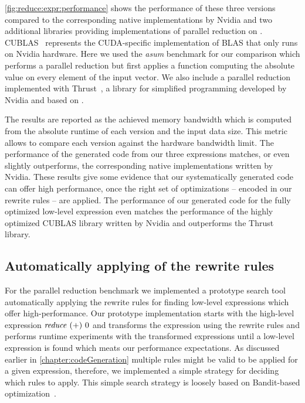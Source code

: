 \autoref{fig:reduce:expr:performance} shows the performance of these three versions compared to the corresponding native \OpenCL implementations by Nvidia and two additional libraries providing implementations of parallel reduction on \GPUs.
CUBLAS~\cite{cuBLAS} represents the CUDA-specific implementation of BLAS that only runs on Nvidia hardware.
Here we used the \emph{asum} benchmark for our comparison which performs a parallel reduction but first applies a function computing the absolute value on every element of the input vector.
We also include a parallel reduction implemented with Thrust~\cite{BellHo2011}, a library for simplified \GPU programming developed by Nvidia and based on \CUDA.

The results are reported as the achieved memory bandwidth which is computed from the absolute runtime of each version and the input data size.
This metric allows to compare each version against the hardware bandwidth limit.
The performance of the generated \OpenCL code from our three expressions matches, or even slightly outperforms, the corresponding native \OpenCL implementations written by Nvidia.
These results give some evidence that our systematically generated code can offer high performance, once the right set of optimizations -- encoded in our rewrite rules -- are applied.
The performance of our generated code for the fully optimized low-level expression even matches the performance of the highly optimized CUBLAS library written by Nvidia and outperforms the Thrust library.

\subsection{Automatically applying of the rewrite rules}

For the parallel reduction benchmark we implemented a prototype search tool automatically applying the rewrite rules for finding low-level expressions which offer high-performance.
Our prototype implementation starts with the high-level expression $\text{\textit{reduce}}\ (+)\ 0$ and transforms the expression using the rewrite rules and performs runtime experiments with the transformed expressions until a low-level \OpenCL expression is found which meats our performance expectations.
As discussed earlier in \autoref{chapter:codeGeneration} multiple rules might be valid to be applied for a given expression, therefore, we implemented a simple strategy for deciding which rules to apply.
This simple search strategy is loosely based on Bandit-based optimization~\cite{}.

